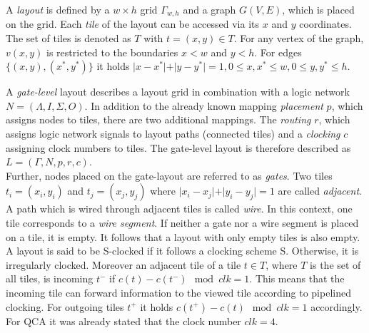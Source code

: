\begin{definition}
	A \textit{layout} is defined by a $w \times h$ grid $\Gamma_{w, h}$ and a graph $G(V, E)$, which is placed on the grid. Each \textit{tile} of the layout can be accessed via its $x$ and $y$ coordinates. The set of tiles is denoted as $T$ with $t = (x, y) \in T$. For any vertex of the graph, $v(x, y)$ is restricted to the boundaries $x < w$ and $y < h$. For edges $\{(x, y), (x^*, y^*)\}$ it holds $\vert x-x^*\vert+\vert y-y^*\vert = 1, 0 \leq x, x^* \leq w, 0 \leq y, y^* \leq h$.
\end{definition}

\begin{definition}
	A \textit{gate-level} layout describes a layout grid in combination with a logic network $N = (\Lambda, I, \Sigma, O)$. In addition to the already known mapping \textit{placement} $p$, which assigns nodes to tiles, there are two additional mappings. The \textit{routing} $r$, which assigns logic network signals to layout paths (connected tiles) and a \textit{clocking} $c$ assigning clock numbers to tiles. The gate-level layout is therefore described as $L = (\Gamma, N, p, r, c)$.\\
	Further, nodes placed on the gate-layout are referred to as \textit{gates}. Two tiles $t_i = (x_i, y_i)$ and $t_j = (x_j, y_j)$ where $\vert x_i-x_j\vert+\vert y_i-y_j\vert = 1$ are called \textit{adjacent}. A path which is wired through adjacent tiles is called \textit{wire}. In this context, one tile corresponds to a \textit{wire segment}. If neither a gate nor a wire segment is placed on a tile, it is empty. It follows that a layout with only empty tiles is also empty. A layout is said to be S-clocked if it follows a clocking scheme S. Otherwise, it is irregularly clocked. Moreover an adjacent tile of a tile $t \in T$, where $T$ is the set of all tiles, is incoming $t^-$ if $c(t) - c(t^-) \mod{clk} = 1$. This means that the incoming tile can forward information to the viewed tile according to pipelined clocking. For outgoing tiles $t^+$ it holds $c(t^+) - c(t) \mod{clk} = 1$ accordingly. For QCA it was already stated that the clock number $clk = 4$.
\end{definition}

